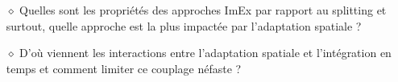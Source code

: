     \begin{enumerate}
        \item[$\diamond$] Quelles sont les propriétés des approches ImEx par rapport au splitting et surtout, quelle approche est la plus impactée par l'adaptation spatiale ?
        \item[$\diamond$] D'où viennent les interactions entre l'adaptation spatiale et l'intégration en temps et comment limiter ce couplage néfaste ?
    \end{enumerate}
